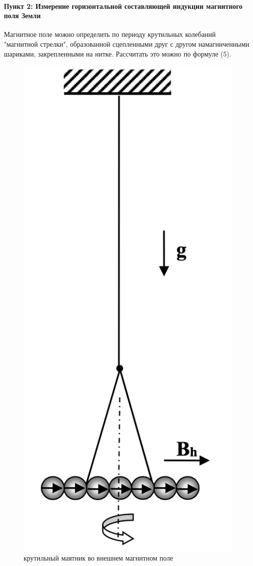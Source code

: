 \documentclass[a4paper,12pt]{article}
\begin{document}
\paragraph{Пункт 2: Измерение горизонтальной составляющей индукции магнитного поля Земли}
Магнитное поле можно определить по периоду крутильных колебаний "магнитной стрелки", образованной сцепленными друг с другом намагниченными шариками, закрепленными на нитке. Рассчитать это можно по формуле (5). 
\begin{figure}[h!]
\centering
\includegraphics[scale=0.25]{ris3.png} 
\caption{крутильный маятник во внешнем магнитном поле}
\end{figure}
\end{document}
